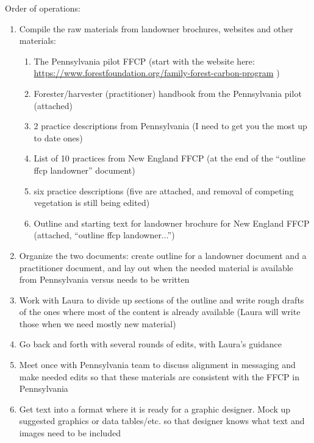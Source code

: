 \documentclass{article}\usepackage[]{graphicx}\usepackage[]{color}
\begin{document}
Order of operations:
\begin{enumerate}
\item Compile the raw materials from landowner brochures, websites and other materials:
  \begin{enumerate}
  \item The Pennsylvania pilot FFCP (start with the website here: \url{https://www.forestfoundation.org/family-forest-carbon-program} )
  \item Forester/harvester (practitioner) handbook from the Pennsylvania pilot (attached)
  \item 2 practice descriptions from Pennsylvania (I need to get you the most up to date ones) 
  \item List of 10 practices from New England FFCP (at the end of the ``outline ffcp landowner'' document) 
  \item six practice descriptions (five are attached, and removal of competing vegetation is still being edited)
  \item Outline and starting text for landowner brochure for New England FFCP (attached, ``outline ffcp landowner...'')
  \end{enumerate}
\item Organize the two documents: create outline for a landowner document and a practitioner document, and lay out when the needed material is available from Pennsylvania versus needs to be written
\item Work with Laura to divide up sections of the outline and write rough drafts of the ones where most of the content is already available (Laura will write those when we need mostly new material)
\item Go back and forth with several rounds of edits, with Laura’s guidance
\item Meet once with Pennsylvania team to discuss alignment in messaging and make needed edits so that these materials are consistent with the FFCP in Pennsylvania
\item Get text into a format where it is ready for a graphic designer. Mock up suggested graphics or data tables/etc. so that designer knows what text and images need to be included
\end{enumerate}
\end{document}

